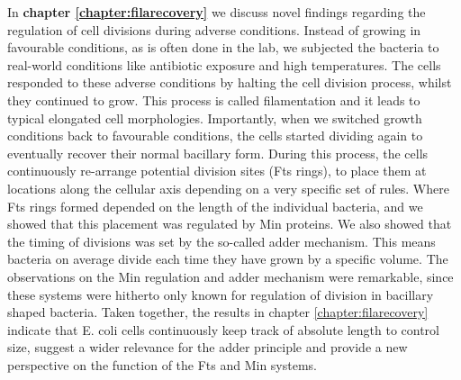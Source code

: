 In \textbf{chapter \ref{chapter:filarecovery}} we discuss 
novel findings regarding 
the regulation of cell divisions during adverse conditions.
%
Instead of growing \ecoli in favourable conditions, as is often done in the lab, we subjected the bacteria to 
real-world conditions like antibiotic exposure and high temperatures.
%
The cells responded to these adverse conditions by halting the cell division process, whilst they continued to grow.
This process is called filamentation and it leads to typical elongated cell morphologies.
%
%
Importantly, when we switched growth conditions back to favourable conditions,
the cells started dividing again to eventually recover their normal bacillary form.%
%
During this process,
the cells continuously re-arrange potential division sites (Fts rings), 
to place them at locations along the cellular axis depending on a very specific set of rules. %
%
Where Fts rings formed depended on the length of the individual bacteria,
and we showed that this placement was regulated by Min proteins.
%
We also showed that the timing of divisions was set by the so-called adder mechanism.
This means bacteria on average divide each time they have grown by a specific volume.
%
The observations on the Min regulation and adder mechanism were remarkable,
since these systems were hitherto only known for regulation of division in bacillary shaped bacteria.
%
Taken together, the results in chapter \ref{chapter:filarecovery} indicate that E. coli cells continuously keep track of absolute length to control size, 
suggest a wider relevance for the adder principle 
and provide a new perspective on the function of the Fts and Min systems.



